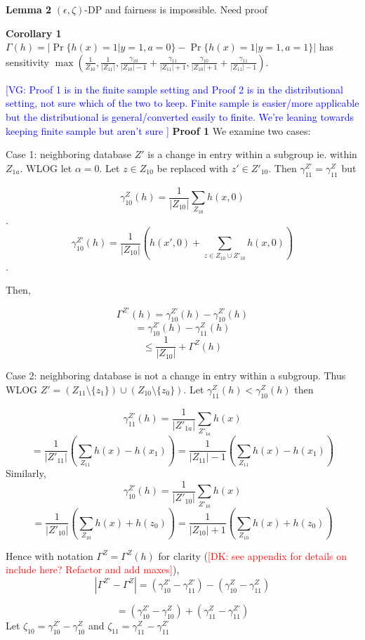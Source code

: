 \documentclass[format = sigconf]{acmart}
\newcommand{\dk}[1]{\textcolor{red}{[DK: #1]}}
\newcommand{\vg}[1]{\textcolor{blue}{[VG: #1]}}
\newcommand{\1}{\mathbbm{1}}
\newcommand{\eps}{\epsilon}
\newcommand{\zt}{\zeta}
\newcommand{\gz}[1]{\gamma_{#1}^Z(h)}
\newcommand{\z}[1]{Z_{#1}}
\theoremstyle{definition}
\begin{document}
{\bf Lemma 2} $(\eps, \zt)$-DP and fairness is impossible. Need proof




{\bf Corollary 1} $\Gamma(h) = |\Pr\{h(x) = 1 | y=1, a =0\} - \Pr\{h(x) = 1 | y = 1, a = 1\}|$ has sensitivity $\max(\frac{1}{\z{10}},\frac{1}{|Z_{11}|}, \frac{\gamma_{10}}{|\z{10}|-1} + \frac{\gamma_{11}}{|Z_{11}|+1}, \frac{\gamma_{10}}{|\z{10}|+1} + \frac{\gamma_{11}}{|Z_{11}|-1}).$

\vg{Proof 1 is in the finite sample setting and Proof 2 is in the distributional setting, not sure which of the two to keep. Finite sample is easier/more applicable but the distributional is general/converted easily to finite. We're leaning towards keeping finite sample but aren't sure }
{\bf Proof 1}
We examine two cases:

Case 1: neighboring database $Z'$ is a change in entry within a subgroup ie. within $Z_{1a}$. WLOG let $\alpha = 0$. Let $z \in \z{10}$ be replaced with $z' \in Z'_{10}$. Then $\gamma^{Z'}_{11} = \gamma^Z_{11}$ but

$$\gamma_{10}^Z(h) = \frac{1}{|\z{10}|} \sum_{\z{10}} h(x,0)$$.
$$\gamma_{10}^{Z'}(h) = \frac{1}{|\z{10}|} (h(x', 0) +\sum_{z \in \z{10} \cup Z'_{10}} h(x, 0))$$.

Then,

$$ \Gamma^{Z'}(h) = \gamma_{10}^{Z'}(h) - \gamma_{10}^{Z'}(h) $$
$$ = \gamma_{10}^{Z'}(h) - \gz{11} $$
$$ \leq \frac{1}{|\z{10}|}  + \Gamma^{Z}(h) $$


Case 2: neighboring database is not a change in entry within a subgroup. Thus WLOG $Z' =(Z_{11}\setminus \{z_1\} )\cup( \z{10}\setminus \{z_0\})$. Let $\gamma_{11}^{Z}(h) <\gamma_{10}^{Z}(h)$ then

$$\gamma_{11}^{Z'}(h) = \frac{1}{|Z'_{1a}|} \sum_{Z'_{1a}} h(x)$$
$$= \frac{1}{|Z'_{11}|} (\sum_{Z_{11}} h(x)-h(x_1)) = \frac{1}{|Z_{11}|-1} (\sum_{Z_{11}} h(x)-h(x_1))$$
Similarly,
$$\gamma_{10}^{Z'}(h) = \frac{1}{|Z'_{10}|} \sum_{Z'_{10}} h(x)$$
$$ = \frac{1}{|Z'_{10}|} (\sum_{\z{10}} h(x)+h(z_0))= \frac{1}{|\z{10}|+1} (\sum_{\z{10}} h(x)+h(z_0))$$

Hence with notation $ \Gamma^Z = \Gamma^Z(h)$ for clarity (\dk{see appendix for details on include here? Refactor and add maxes}), $$|\Gamma^{Z'}- \Gamma^{Z}| = (\gamma_{10}^{Z'} - \gamma_{11}^{Z'}) - (\gamma_{10}^{Z} - \gamma_{11}^{Z})$$


$$=(\gamma_{10}^{Z'}- \gamma_{10}^{Z}) + (\gamma_{11}^{Z} -\gamma_{11}^{Z'})$$
Let $\zt_{10}= \gamma_{10}^{Z'}- \gamma_{10}^{Z}$ and  $\zt_{11} = \gamma_{11}^{Z} -\gamma_{11}^{Z'}$
\end{document}
